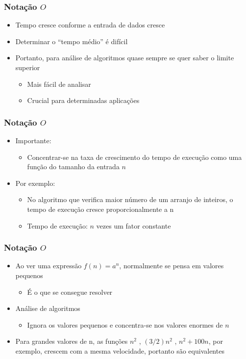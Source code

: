 \documentclass[aspectratio=169]{beamer}
\begin{document}
\begin{frame}\frametitle{Notação $O$}
\begin{itemize}
	\item Tempo cresce conforme a entrada de dados cresce
	\item Determinar o ``tempo médio'' é difícil
	\item Portanto, para análise de algoritmos quase sempre se quer saber o limite superior
	\begin{itemize}
		\item Mais fácil de analisar
		\item Crucial para determinadas aplicações
	\end{itemize}
\end{itemize}
\end{frame}

\begin{frame}\frametitle{Notação $O$}
\begin{itemize}
	\item Importante:
	\begin{itemize}
		\item Concentrar-se na taxa de crescimento do tempo de execução como uma função do tamanho da entrada $n$
	\end{itemize}
	\item Por exemplo:
	\begin{itemize}
		\item No algoritmo que verifica maior número de um arranjo de inteiros, o tempo de execução cresce proporcionalmente a n
		\item Tempo de execução: $n$ vezes um fator constante
	\end{itemize}
\end{itemize}
\end{frame}

\begin{frame}\frametitle{Notação $O$}
\begin{itemize}
	\item Ao ver uma expressão $f(n) = a^n$, normalmente se pensa em valores pequenos
	\begin{itemize}
		\item É o que se consegue resolver
	\end{itemize}
	\item Análise de algoritmos
	\begin{itemize}
		\item Ignora os valores pequenos e concentra-se nos valores enormes de $n$
	\end{itemize}
	\item Para grandes valores de n, as funções $n^2$ , $(3/2)n^2$ , $n^2+100n$, por exemplo, crescem com a mesma velocidade, portanto são equivalentes
\end{itemize}
\end{frame}
\end{document}

